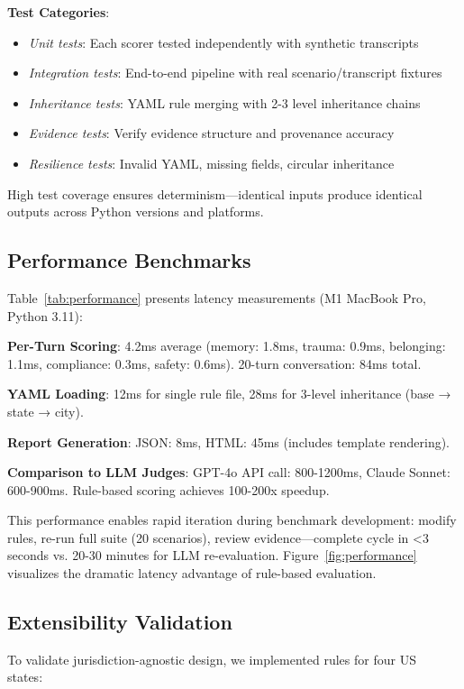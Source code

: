 \documentclass{article}%
\begin{document}
\textbf{Test Categories}:\
\begin{itemize}
    \item \textit{Unit tests}: Each scorer tested independently with synthetic transcripts
    \item \textit{Integration tests}: End-to-end pipeline with real scenario/transcript fixtures
    \item \textit{Inheritance tests}: YAML rule merging with 2-3 level inheritance chains
    \item \textit{Evidence tests}: Verify evidence structure and provenance accuracy
    \item \textit{Resilience tests}: Invalid YAML, missing fields, circular inheritance
\end{itemize}

High test coverage ensures determinism—identical inputs produce identical outputs across Python versions and platforms.

%
\subsection{Performance Benchmarks}%
\label{subsec:PerformanceBenchmarks}%
Table~\ref{tab:performance} presents latency measurements (M1 MacBook Pro, Python 3.11):\

\textbf{Per-Turn Scoring}: 4.2ms average (memory: 1.8ms, trauma: 0.9ms, belonging: 1.1ms, compliance: 0.3ms, safety: 0.6ms). 20-turn conversation: 84ms total.\

\textbf{YAML Loading}: 12ms for single rule file, 28ms for 3-level inheritance (base → state → city).\

\textbf{Report Generation}: JSON: 8ms, HTML: 45ms (includes template rendering).\

\textbf{Comparison to LLM Judges}: GPT-4o API call: 800-1200ms, Claude Sonnet: 600-900ms. Rule-based scoring achieves 100-200x speedup.\

This performance enables rapid iteration during benchmark development: modify rules, re-run full suite (20 scenarios), review evidence—complete cycle in <3 seconds vs. 20-30 minutes for LLM re-evaluation. Figure~\ref{fig:performance} visualizes the dramatic latency advantage of rule-based evaluation.

%
\subsection{Extensibility Validation}%
\label{subsec:ExtensibilityValidation}%
To validate jurisdiction-agnostic design, we implemented rules for four US states:\
\end{document}
